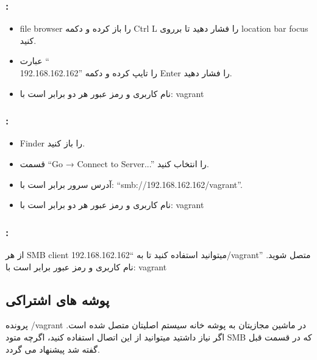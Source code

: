 \subsubsection{
:
}
\begin{itemize}
\item
file browser را باز کرده و دکمه Ctrl L را فشار دهید تا برروی location bar focus کنید.
\item
عبارت “\\192.168.162.162\vagrant” را تایپ کرده و دکمه Enter را فشار دهید.
\item
نام کاربری و رمز عبور هر دو برابر است با: vagrant
\end{itemize}
\subsubsection{
:
}
\begin{itemize}
\item
Finder را باز کنید.
\item
قسمت “Go → Connect to Server...” را انتخاب کنید.
\item
آدرس سرور برابر است با: “smb://192.168.162.162/vagrant”.
\item
نام کاربری و رمز عبور هر دو برابر است با: vagrant
\end{itemize}
\subsubsection{
:
}
از هر SMB client میتوانید استفاده کنید تا به “192.168.162.162/vagrant” متصل شوید.
نام کاربری و رمز عبور برابر است با: vagrant

\subsection{پوشه های اشتراکی}
پرونده /vagrant در ماشین مجازیتان به پوشه خانه سیستم اصلیتان متصل شده است. اگر نیاز داشتید میتوانید از این اتصال استفاده کنید، اگرچه متود SMB که در قسمت قبل گفته شد پیشنهاد می گردد.